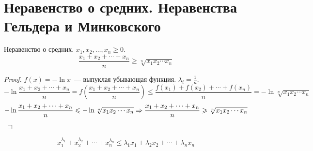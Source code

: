 ﻿\section{Неравенство о средних. Неравенства Гельдера и Минковского}

\begin{conseq}
Неравенство о средних. $x_1, x_2, \ldots, x_n \ge 0$.
$$\frac{x_1 + x_2 + \cdots + x_n}n \geqslant \sqrt[n]{x_1x_2 \cdots x_n}$$
\end{conseq}
\begin{proof}
$f(x) = -\ln x$~--- выпуклая убывающая функция. $\lambda_i = \frac1n$.
$$-\ln \frac{x_1 + x_2 + \cdots + x_n}n = f \left(\frac{x_1 + x_2 + \cdots + x_n}n\right) \leqslant \frac{f(x_1) + f(x_2) + \cdots + f(x_n)}n = -\ln \sqrt[n]{x_1x_2 \cdots x_n}$$
$$-\ln \frac{x_1 + x_2 + \cdots + x_n}n \leqslant -\ln \sqrt[n]{x_1x_2 \cdots x_n} \Rightarrow \frac{x_1 + x_2 + \cdots + x_n}n \geqslant \sqrt[n]{x_1x_2 \cdots x_n}$$
\end{proof}
\begin{conseq}
$$x_1^{\lambda_1} + x_2^{\lambda_2} + \cdots + x_n^{\lambda_n} \leqslant \lambda_1x_1 + \lambda_2x_2 + \cdots + \lambda_n x_n$$
\end{conseq}

